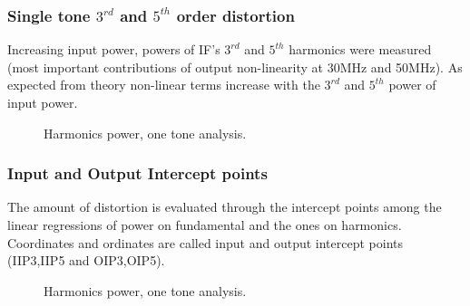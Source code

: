 \begin{frame}
\frametitle{Single tone $3^{rd}$ and $5^{th}$ order distortion}
	Increasing input power, powers of IF's $3^{rd}$ and $5^{th}$ harmonics were measured (most important contributions of output non-linearity at 30MHz and 50MHz). As expected from theory non-linear terms increase with the $3^{rd}$ and $5^{th}$ power of input power.
	\begin{figure}[H] 
		\centering
		\caption{Harmonics power, one tone analysis.}
		\label{fig:IIP3_1t_schem}
	\end{figure}
\end{frame}

\begin{frame}
\frametitle{Input and Output Intercept points}
The amount of distortion is evaluated through the intercept points among the linear regressions of power on fundamental and the ones on harmonics. Coordinates and ordinates are called input and output intercept points (IIP3,IIP5 and OIP3,OIP5).
\begin{figure}[H] 
	\centering
	\caption{Harmonics power, one tone analysis.}
	\label{fig:IIP3_1t_schem}
\end{figure}
\end{frame}

